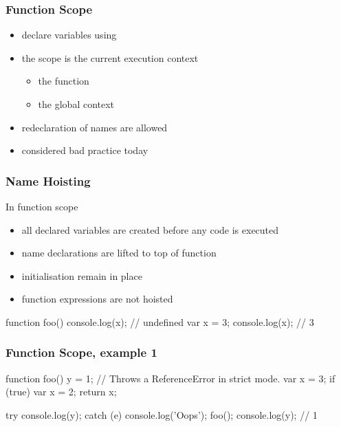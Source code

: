 \begin{frame}[fragile] \frametitle{Function Scope}
\begin{itemize}
  \item declare variables using 
  \item the scope is the current execution context
  \begin{itemize}
    \item the function
    \item the global context
  \end{itemize}
  \item redeclaration of names are allowed
  \item considered bad practice today
\end{itemize}
\end{frame}

\begin{frame}[fragile] \frametitle{Name Hoisting}
In function scope
\begin{itemize}
  \item all declared variables are created before any code is executed
  \item name declarations are lifted to top of function
  \item initialisation remain in place
  \item function expressions are not hoisted
\end{itemize}

\begin{CodeBox}{}
function foo() {
  console.log(x);  // undefined
  var x = 3;
  console.log(x);  // 3
}
\end{CodeBox}
\end{frame}

\begin{frame}[fragile] \frametitle{Function Scope, example 1}

\begin{CodeBox}{}
function foo() {
  y = 1; // Throws a ReferenceError in strict mode.
  var x = 3;
  if (true) {
    var x = 2;
  }
  return x;
}

try {
  console.log(y);
} catch (e) {  console.log('Oops');  }
foo();
console.log(y); // 1
\end{CodeBox}
\end{frame}

